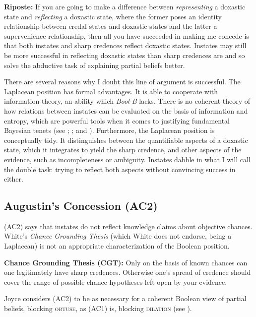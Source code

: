 \documentclass[11pt]{article}
\newcommand{\augustin}[0]{\textit{Bool-B}}
\begin{document}
\begin{quotex}
  \textbf{Riposte:} If you are going to make a difference between
  \emph{representing} a doxastic state and \emph{reflecting} a
  doxastic state, where the former poses an identity relationship
  between credal states and doxastic states and the latter a
  supervenience relationship, then all you have succeeded in making me
  concede is that both instates and sharp credences reflect doxastic
  states. Instates may still be more successful in reflecting doxastic
  states than sharp credences are and so solve the abductive task of
  explaining partial beliefs better.
\end{quotex}

There are several reasons why I doubt this line of argument is
successful. The Laplacean position has formal advantages. It is able
to cooperate with information theory, an ability which {\augustin}
lacks. There is no coherent theory of how relations between instates
can be evaluated on the basis of information and entropy, which are
powerful tools when it comes to justifying fundamental Bayesian tenets
(see ; ; and
). Furthermore, the Laplacean position is
conceptually tidy. It distinguishes between the quantifiable aspects
of a doxastic state, which it integrates to yield the sharp credence,
and other aspects of the evidence, such as incompleteness or
ambiguity. Instates dabble in what I will call the double task: trying
to reflect both aspects without convincing success in either.

\subsection{Augustin's Concession (AC2)}
\label{jj2}

(AC2) says that instates do not reflect knowledge claims about
objective chances. White's \emph{Chance Grounding Thesis} (which White
does not endorse, being a Laplacean) is not an appropriate
characterization of the Boolean position.

\begin{quotex}
  \textbf{Chance Grounding Thesis (CGT):} Only on the basis of known
  chances can one legitimately have sharp credences. Otherwise one's
  spread of credence should cover the range of possible chance
  hypotheses left open by your evidence.
\end{quotex}

Joyce considers (AC2) to be as necessary for a coherent Boolean view
of partial beliefs, blocking \textsc{obtuse}, as (AC1) is, blocking
\textsc{dilation} (see ). 
\end{document}

